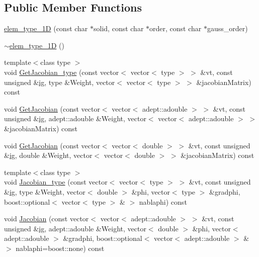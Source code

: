 \subsection*{Public Member Functions}
\begin{DoxyCompactItemize}
\item 
\mbox{\hyperlink{classfemus_1_1elem__type__1_d_a30be54e2c9797a64f2890ff3010a2437}{elem\+\_\+type\+\_\+1D}} (const char $\ast$solid, const char $\ast$order, const char $\ast$gauss\+\_\+order)
\item 
\mbox{\hyperlink{classfemus_1_1elem__type__1_d_a7525c96e56004b6f04d75c6228d93d90}{$\sim$elem\+\_\+type\+\_\+1D}} ()
\item 
{\footnotesize template$<$class type $>$ }\\void \mbox{\hyperlink{classfemus_1_1elem__type__1_d_a4061091e86269a2ae013083b3c46e5ad}{Get\+Jacobian\+\_\+type}} (const vector$<$ vector$<$ type $>$ $>$ \&vt, const unsigned \&\mbox{\hyperlink{namespacefemus_a6df31099f676311de214a312d7043941}{ig}}, type \&Weight, vector$<$ vector$<$ type $>$ $>$ \&jacobian\+Matrix) const
\item 
void \mbox{\hyperlink{classfemus_1_1elem__type__1_d_af21e2d104c0f4ca0d18e5e51c8f5c91f}{Get\+Jacobian}} (const vector$<$ vector$<$ adept\+::adouble $>$ $>$ \&vt, const unsigned \&\mbox{\hyperlink{namespacefemus_a6df31099f676311de214a312d7043941}{ig}}, adept\+::adouble \&Weight, vector$<$ vector$<$ adept\+::adouble $>$ $>$ \&jacobian\+Matrix) const
\item 
void \mbox{\hyperlink{classfemus_1_1elem__type__1_d_ad39cd6dbe648f384fa1be74d5ceec783}{Get\+Jacobian}} (const vector$<$ vector$<$ double $>$ $>$ \&vt, const unsigned \&\mbox{\hyperlink{namespacefemus_a6df31099f676311de214a312d7043941}{ig}}, double \&Weight, vector$<$ vector$<$ double $>$ $>$ \&jacobian\+Matrix) const
\item 
{\footnotesize template$<$class type $>$ }\\void \mbox{\hyperlink{classfemus_1_1elem__type__1_d_af1950c8d96453aafcd57bd254b68a094}{Jacobian\+\_\+type}} (const vector$<$ vector$<$ type $>$ $>$ \&vt, const unsigned \&\mbox{\hyperlink{namespacefemus_a6df31099f676311de214a312d7043941}{ig}}, type \&Weight, vector$<$ double $>$ \&phi, vector$<$ type $>$ \&gradphi, boost\+::optional$<$ vector$<$ type $>$ \& $>$ nablaphi) const
\item 
void \mbox{\hyperlink{classfemus_1_1elem__type__1_d_a4c063f6c2d18fbc305e3bde505c49279}{Jacobian}} (const vector$<$ vector$<$ adept\+::adouble $>$ $>$ \&vt, const unsigned \&\mbox{\hyperlink{namespacefemus_a6df31099f676311de214a312d7043941}{ig}}, adept\+::adouble \&Weight, vector$<$ double $>$ \&phi, vector$<$ adept\+::adouble $>$ \&gradphi, boost\+::optional$<$ vector$<$ adept\+::adouble $>$ \& $>$ nablaphi=boost\+::none) const

\end{DoxyCompactItemize}
